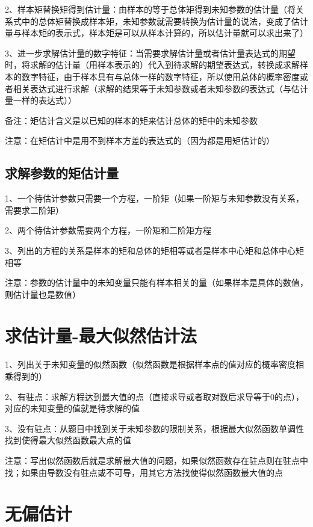 2、样本矩替换矩得到估计量：由样本的等于总体矩得到未知参数的估计量（将关系式中的总体矩替换成样本矩，未知参数就需要转换为估计量的说法，变成了估计量与样本矩的表示式，样本矩是可以从样本计算的，所以估计量就可以求出来了）

3、进一步求解估计量的数字特征：当需要求解估计量或者估计量表达式的期望时，将求解的估计量（用样本表示的）代入到待求解的期望表达式，转换成求解样本的数字特征，由于样本具有与总体一样的数字特征，所以使用总体的概率密度或者相关表达式进行求解（求解的结果等于未知参数或者未知参数的表达式（与估计量一样的表达式））

备注：矩估计含义是以已知的样本的矩来估计总体的矩中的未知参数

注意：在矩估计中是用不到样本方差的表达式的（因为都是用矩估计的）



\subsection{求解参数的矩估计量}

1、一个待估计参数只需要一个方程，一阶矩（如果一阶矩与未知参数没有关系，需要求二阶矩）

2、两个待估计参数需要两个方程，一阶矩和二阶矩方程

3、列出的方程的关系是样本的矩和总体的矩相等或者是样本中心矩和总体中心矩相等

注意：参数的估计量中的未知变量只能有样本相关的量（如果样本是具体的数值，则估计量也是数值）

\section{求估计量-最大似然估计法}

1、列出关于未知变量的似然函数（似然函数是根据样本点的值对应的概率密度相乘得到的）

2、有驻点：求解方程达到最大值的点（直接求导或者取对数后求导等于0的点），对应的未知变量的值就是待求解的值

3、没有驻点：从题目中找到关于未知参数的限制关系，根据最大似然函数单调性找到使得最大似然函数最大点的值

注意：写出似然函数后就是求解最大值的问题，如果似然函数存在驻点则在驻点中找；如果由导数没有驻点或不可导，用其它方法找使得似然函数最大值的点

\section{无偏估计}

